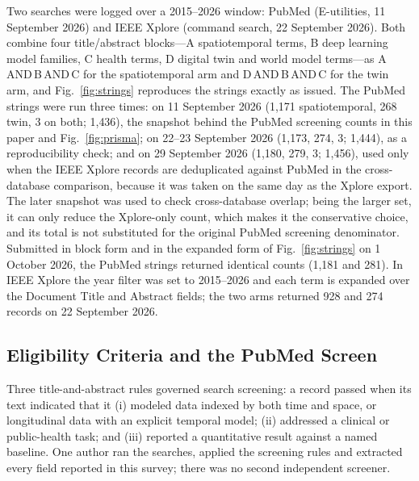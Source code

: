 \documentclass[journal]{IEEEtran}
\begin{document}
Two searches were logged over a 2015--2026 window: PubMed (E-utilities, 11 September 2026) and IEEE Xplore (command search, 22 September 2026). Both combine four title/abstract blocks---A spatiotemporal terms, B deep learning model families, C health terms, D digital twin and world model terms---as A\,AND\,B\,AND\,C for the spatiotemporal arm and D\,AND\,B\,AND\,C for the twin arm, and Fig.~\ref{fig:strings} reproduces the strings exactly as issued. The PubMed strings were run three times: on 11 September 2026 (1{,}171 spatiotemporal, 268 twin, 3 on both; 1{,}436), the snapshot behind the PubMed screening counts in this paper and Fig.~\ref{fig:prisma}; on 22--23 September 2026 (1{,}173, 274, 3; 1{,}444), as a reproducibility check; and on 29 September 2026 (1{,}180, 279, 3; 1{,}456), used only when the IEEE Xplore records are deduplicated against PubMed in the cross-database comparison, because it was taken on the same day as the Xplore export. The later snapshot was used to check cross-database overlap; being the larger set, it can only reduce the Xplore-only count, which makes it the conservative choice, and its total is not substituted for the original PubMed screening denominator. Submitted in block form and in the expanded form of Fig.~\ref{fig:strings} on 1 October 2026, the PubMed strings returned identical counts (1{,}181 and 281). In IEEE Xplore the year filter was set to 2015--2026 and each term is expanded over the Document Title and Abstract fields; the two arms returned 928 and 274 records on 22 September 2026.

\subsection{Eligibility Criteria and the PubMed Screen}
Three title-and-abstract rules governed search screening: a record passed when its text indicated that it (i) modeled data indexed by both time and space, or longitudinal data with an explicit temporal model; (ii) addressed a clinical or public-health task; and (iii) reported a quantitative result against a named baseline. One author ran the searches, applied the screening rules and extracted every field reported in this survey; there was no second independent screener.
\end{document}
